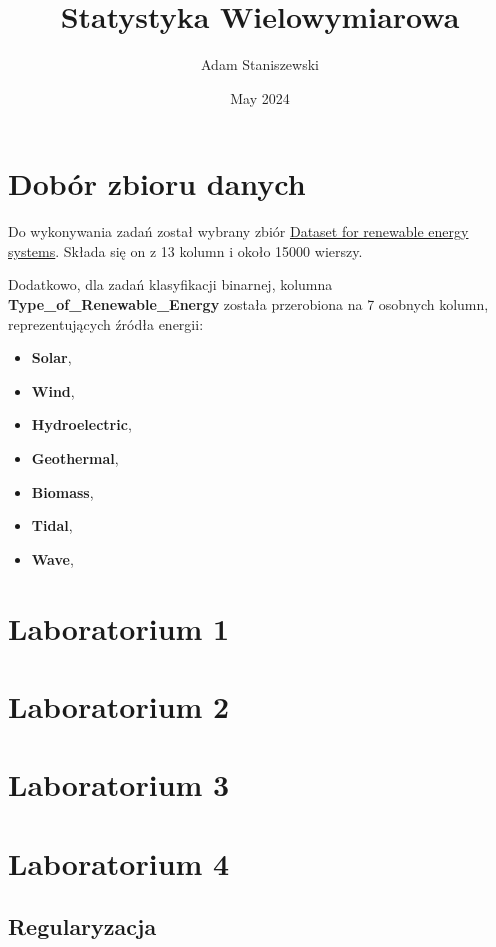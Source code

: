 \documentclass{article}
\title{Statystyka Wielowymiarowa}
\author{Adam Staniszewski}
\date{May 2024}
\begin{document}
\maketitle

\tableofcontents  %

\section{Dobór zbioru danych}
Do wykonywania zadań został wybrany zbiór \href{https://www.kaggle.com/datasets/girumwondemagegn/dataset-for-renewable-energy-systems}{Dataset for renewable energy systems}. Składa się on z 13 kolumn i około 15000 wierszy. 

Dodatkowo, dla zadań klasyfikacji binarnej, kolumna \textbf{Type\_of\_Renewable\_Energy} została przerobiona na 7 osobnych kolumn, reprezentujących źródła energii:
\begin{itemize}
    \item \textbf{Solar},
    \item \textbf{Wind},
    \item \textbf{Hydroelectric},
    \item \textbf{Geothermal},
    \item \textbf{Biomass},
    \item \textbf{Tidal},
    \item \textbf{Wave},
\end{itemize}

\section{Laboratorium 1}


\section{Laboratorium 2}


\section{Laboratorium 3}


\section{Laboratorium 4}
\subsection{Regularyzacja}
\end{document}
